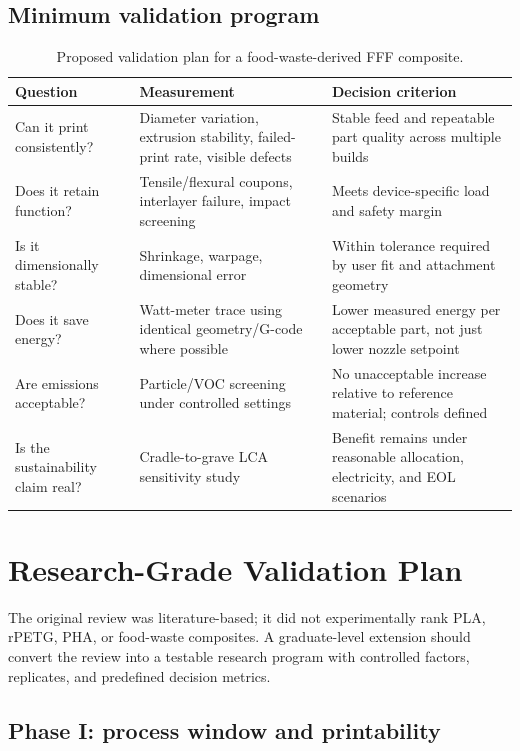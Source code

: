 \documentclass[11pt]{article}
\begin{document}
\subsection{Minimum validation program}

\begin{table}[htbp]
\centering
\small
\caption{Proposed validation plan for a food-waste-derived FFF composite.}
\begin{tabularx}{\textwidth}{@{}p{}p{}Y@{}}
\toprule
\textbf{Question} & \textbf{Measurement} & \textbf{Decision criterion} \\
\midrule
Can it print consistently? & Diameter variation, extrusion stability, failed-print rate, visible defects & Stable feed and repeatable part quality across multiple builds \\
Does it retain function? & Tensile/flexural coupons, interlayer failure, impact screening & Meets device-specific load and safety margin \\
Is it dimensionally stable? & Shrinkage, warpage, dimensional error & Within tolerance required by user fit and attachment geometry \\
Does it save energy? & Watt-meter trace using identical geometry/G-code where possible & Lower measured energy per acceptable part, not just lower nozzle setpoint \\
Are emissions acceptable? & Particle/VOC screening under controlled settings & No unacceptable increase relative to reference material; controls defined \\
Is the sustainability claim real? & Cradle-to-grave LCA sensitivity study & Benefit remains under reasonable allocation, electricity, and EOL scenarios \\
\bottomrule
\end{tabularx}
\end{table}

\section{Research-Grade Validation Plan}

The original review was literature-based; it did not experimentally rank PLA, rPETG, PHA, or food-waste composites. A graduate-level extension should convert the review into a testable research program with controlled factors, replicates, and predefined decision metrics.

\subsection{Phase I: process window and printability}
\end{document}
